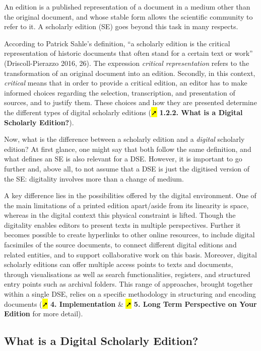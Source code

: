 \documentclass[
  letterpaper,
  DIV=11,
  numbers=noendperiod]{scrreprt}
\begin{document}
An edition is a published representation of a document in a medium other
than the original document, and whose stable form allows the scientific
community to refer to it. A scholarly edition (SE) goes beyond this task
in many respects.

According to Patrick Sahle's definition, ``a scholarly edition is the
critical representation of historic documents that often stand for a
certain text or work'' (Driscoll-Pierazzo 2016, 26). The expression
\emph{critical representation} refers to the transformation of an
original document into an edition. Secondly, in this context,
\emph{critical} means that in order to provide a critical edition, an
editor has to make informed choices regarding the selection,
transcription, and presentation of sources, and to justify them. These
choices and how they are presented determine the different types of
digital scholarly editions (\hl{➚} \textbf{1.2.2. What is a Digital
Scholarly Edition?}).

Now, what is the difference between a scholarly edition and a
\emph{digital} scholarly edition? At first glance, one might say that
both follow the same definition, and what defines an SE is also relevant
for a DSE. However, it is important to go further and, above all, to not
assume that a DSE is just the digitised version of the SE: digitality
involves more than a change of medium.

A key difference lies in the possibilities offered by the digital
environment. One of the main limitations of a printed edition
apart/aside from its linearity is space, whereas in the digital context
this physical constraint is lifted. Though the digitality enables
editors to present texts in multiple perspectives. Further it becomes
possible to create hyperlinks to other online resources, to include
digital facsimiles of the source documents, to connect different digital
editions and related entities, and to support collaborative work on this
basis. Moreover, digital scholarly editions can offer multiple access
points to texts and documents, through visualisations as well as search
functionalities, registers, and structured entry points such as archival
folders. This range of approaches, brought together within a single DSE,
relies on a specific methodology in structuring and encoding documents
(\hl{➚} \textbf{4. Implementation} \& \hl{➚} \textbf{5. Long Term
Perspective on Your Edition} for more detail).

\subsection{What is a Digital Scholarly
Edition?}\label{what-is-a-digital-scholarly-edition}
\end{document}
